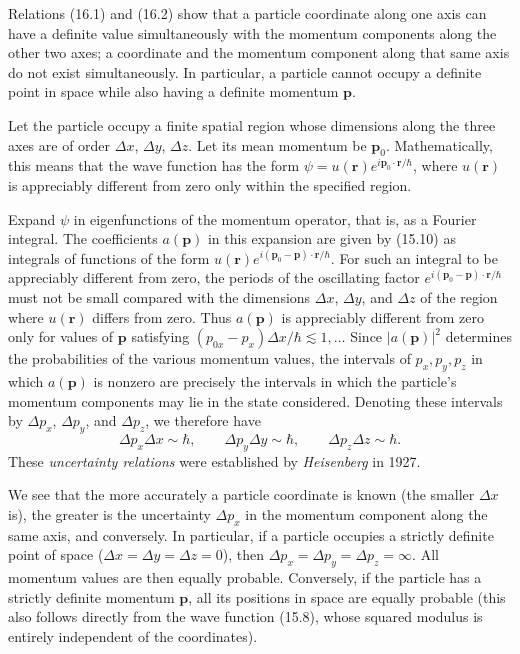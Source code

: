 Relations (16.1) and (16.2) show that a particle coordinate along one axis can
have a definite value simultaneously with the momentum components along the
other two axes; a coordinate and the momentum component along that same axis%
do not exist simultaneously. In particular, a particle cannot occupy a
definite point in space while also having a definite momentum $\mathbf p$.

Let the particle occupy a finite spatial region whose dimensions along the
three axes are of order $\Delta x$, $\Delta y$, $\Delta z$. Let its mean
momentum be $\mathbf p_0$. Mathematically, this means that the wave function
has the form
$\psi=u(\mathbf r)e^{i\mathbf p_0\cdot\mathbf r/\hbar}$, where
$u(\mathbf r)$ is appreciably different from zero only within the specified
region.

Expand $\psi$ in eigenfunctions of the momentum operator, that is, as a
Fourier integral. The coefficients $a(\mathbf p)$ in this expansion are given
by (15.10) as integrals of functions of the form
$u(\mathbf r)e^{i(\mathbf p_0-\mathbf p)\cdot\mathbf r/\hbar}$. For such an
integral to be appreciably different from zero, the periods of the oscillating
factor $e^{i(\mathbf p_0-\mathbf p)\cdot\mathbf r/\hbar}$ must not be small
compared with the dimensions $\Delta x$, $\Delta y$, and $\Delta z$ of the
region where $u(\mathbf r)$ differs from zero. Thus $a(\mathbf p)$ is
appreciably different from zero only for values of $\mathbf p$ satisfying
$(p_{0x}-p_x)\Delta x/\hbar\lesssim1,\ldots$ Since $|a(\mathbf p)|^2$
determines the probabilities of the various momentum values, the intervals of
$p_x,p_y,p_z$ in which $a(\mathbf p)$ is nonzero are precisely the intervals
in which the particle's momentum components may lie in the state considered.
Denoting these intervals by $\Delta p_x$, $\Delta p_y$, and $\Delta p_z$, we
therefore have
\begin{equation}
  \Delta p_x\Delta x\sim\hbar,\qquad
  \Delta p_y\Delta y\sim\hbar,\qquad
  \Delta p_z\Delta z\sim\hbar.
  \tag{16.6}
\end{equation}
These \emph{uncertainty relations} were established by \emph{Heisenberg} in
1927.

We see that the more accurately a particle coordinate is known (the smaller
$\Delta x$ is), the greater is the uncertainty $\Delta p_x$ in the momentum
component along the same axis, and conversely. In particular, if a particle
occupies a strictly definite point of space
($\Delta x=\Delta y=\Delta z=0$), then
$\Delta p_x=\Delta p_y=\Delta p_z=\infty$. All momentum values are then
equally probable. Conversely, if the particle has a strictly definite
momentum $\mathbf p$, all its positions in space are equally probable (this
also follows directly from the wave function (15.8), whose squared modulus is
entirely independent of the coordinates).

